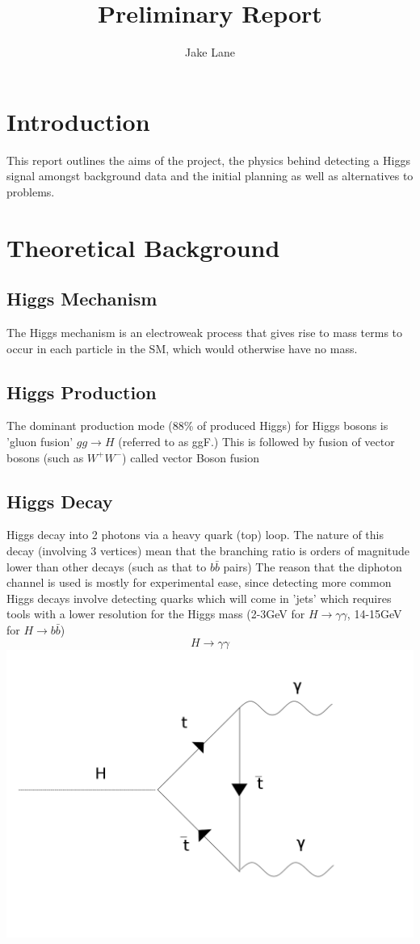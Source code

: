 \documentclass{article}
\title{Preliminary Report}
\author{Jake Lane}
\begin{document}
\maketitle
\section{Introduction}
This report outlines the aims of the project, the physics behind detecting a Higgs signal amongst background data and the initial planning as well as alternatives to problems.
\section{Theoretical Background}
\subsection{Higgs Mechanism}
The Higgs mechanism is an electroweak process that gives rise to mass terms to occur in each particle in the SM, which would otherwise have no mass.
\subsection{Higgs Production}
The dominant production mode (88\% of produced Higgs) for Higgs bosons is 'gluon fusion' $gg \rightarrow H$  (referred to as ggF.) This is followed by fusion of vector bosons (such as $W^+ W^-$) called vector Boson fusion
\subsection{Higgs Decay}
Higgs decay into 2 photons via a heavy quark (top) loop. The nature of this decay (involving 3 vertices) mean that the branching ratio is orders of magnitude lower than other decays (such as that to $b \bar{b}$ pairs)
The reason that the diphoton channel is used is mostly for experimental ease, since detecting more common Higgs decays involve detecting quarks which will come in 'jets' which requires tools with a lower resolution for the Higgs mass (2-3GeV for $H \rightarrow \gamma \gamma$, 14-15GeV for $H \rightarrow b {\bar{b}}$) \cite[p.~2]{diphotosig}
\begin{equation}
H \rightarrow \gamma \gamma
\end{equation}
\includegraphics[scale=0.25]{higgsdecaydiphoton}
\end{document}
